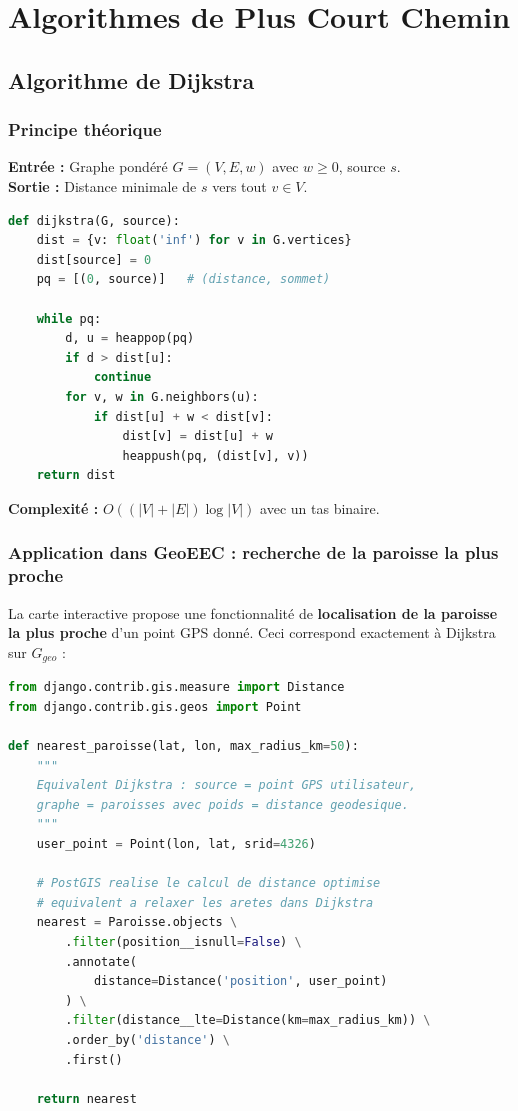 \documentclass[12pt, a4paper]{report}
\theoremstyle{definition}
\begin{document}
\chapter{Algorithmes de Plus Court Chemin}

\section{Algorithme de Dijkstra}

\subsection{Principe théorique}

\begin{tcolorbox}[algobox, title=Algorithme de Dijkstra]
\textbf{Entrée :} Graphe pondéré $G = (V, E, w)$ avec $w \geq 0$, source $s$.\\
\textbf{Sortie :} Distance minimale de $s$ vers tout $v \in V$.

\begin{lstlisting}[language=Python, numbers=none]
def dijkstra(G, source):
    dist = {v: float('inf') for v in G.vertices}
    dist[source] = 0
    pq = [(0, source)]   # (distance, sommet)

    while pq:
        d, u = heappop(pq)
        if d > dist[u]:
            continue
        for v, w in G.neighbors(u):
            if dist[u] + w < dist[v]:
                dist[v] = dist[u] + w
                heappush(pq, (dist[v], v))
    return dist
\end{lstlisting}
\end{tcolorbox}

\textbf{Complexité :} $O((|V| + |E|) \log |V|)$ avec un tas binaire.

\subsection{Application dans GeoEEC : recherche de la paroisse la plus proche}

La carte interactive propose une fonctionnalité de \textbf{localisation de la paroisse la plus proche} d'un point GPS donné. Ceci correspond exactement à Dijkstra sur $G_{geo}$ :

\begin{lstlisting}[language=Python, caption=Recherche de la paroisse la plus proche (Dijkstra)]
from django.contrib.gis.measure import Distance
from django.contrib.gis.geos import Point

def nearest_paroisse(lat, lon, max_radius_km=50):
    """
    Equivalent Dijkstra : source = point GPS utilisateur,
    graphe = paroisses avec poids = distance geodesique.
    """
    user_point = Point(lon, lat, srid=4326)

    # PostGIS realise le calcul de distance optimise
    # equivalent a relaxer les aretes dans Dijkstra
    nearest = Paroisse.objects \
        .filter(position__isnull=False) \
        .annotate(
            distance=Distance('position', user_point)
        ) \
        .filter(distance__lte=Distance(km=max_radius_km)) \
        .order_by('distance') \
        .first()

    return nearest
\end{lstlisting}
\end{document}
